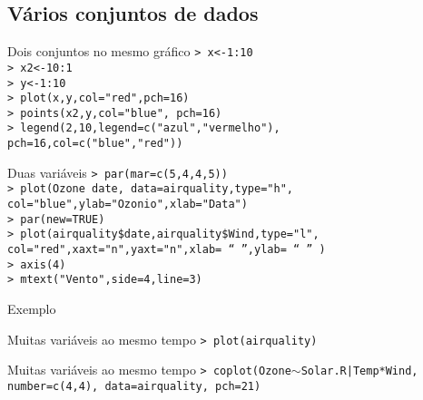 \documentclass{beamer}
\begin{document}
\subsection{Vários conjuntos de dados}
\begin{frame}{Dois conjuntos no mesmo gráfico}
\texttt{> x<-1:10\\
> x2<-10:1\\
> y<-1:10\\
> plot(x,y,col="red",pch=16)\\
> points(x2,y,col="blue", pch=16)\\
> legend(2,10,legend=c("azul","vermelho"), \\
pch=16,col=c("blue","red"))}
\begin{center}
\end{center}
\end{frame}

\begin{frame}{Duas variáveis}
\texttt{>  par(mar=c(5,4,4,5))\\
> plot(Ozone~date, data=airquality,type="h", col="blue",ylab="Ozonio",xlab="Data")\\
> par(new=TRUE)\\
> plot(airquality\$date,airquality\$Wind,type="l", col="red",xaxt="n",yaxt="n",xlab= ``  '',ylab= ``  '' )\\
> axis(4)\\
> mtext("Vento",side=4,line=3)}\\
\end{frame}

\begin{frame}{Exemplo}
\centering
{}
  
\end{frame}

\begin{frame}{Muitas variáveis ao mesmo tempo}
\texttt{> plot(airquality)}

\begin{center}
\end{center}
 
\end{frame}

\begin{frame}{Muitas variáveis ao mesmo tempo}
\texttt{> coplot(Ozone$\sim$Solar.R|Temp*Wind, number=c(4,4), data=airquality, pch=21)}
\begin{center}
   
\end{center}

\end{frame}
\end{document}
